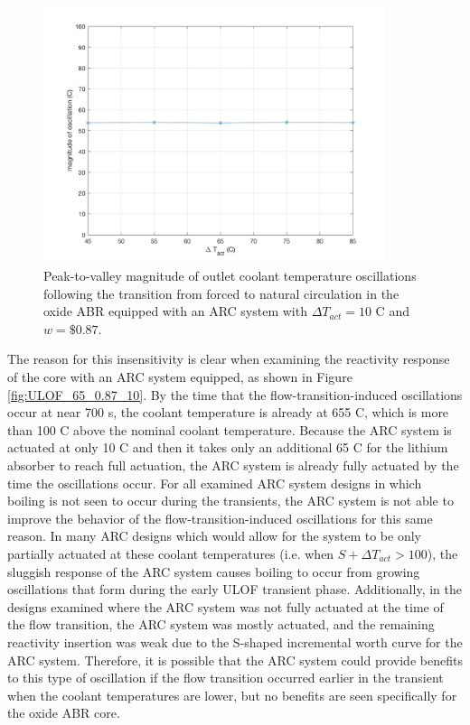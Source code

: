 \documentclass[11pt, oneside]{article}   	%
\begin{document}
\begin{figure}[h!]
\includegraphics[width=10cm]{ULOF_oscillationsWithS}
\centering
\caption{Peak-to-valley magnitude of outlet coolant temperature oscillations following the transition from forced to natural circulation in the oxide ABR equipped with an ARC system with $\Delta T_{act} = 10$ C and $w = \$0.87$.}
\label{fig:ULOF_oscillationsWithS}
\end{figure}

The reason for this insensitivity is clear when examining the reactivity response of the core with an ARC system equipped, as shown in Figure \ref{fig:ULOF_65_0.87_10}.
By the time that the flow-transition-induced oscillations occur at near 700 s, the coolant temperature is already at 655 C, which is more than 100 C above the nominal coolant temperature. 
Because the ARC system is actuated at only 10 C and then it takes only an additional 65 C for the lithium absorber to reach full actuation, the ARC system is already fully actuated by the time the oscillations occur. 
For all examined ARC system designs in which boiling is not seen to occur during the transients, the ARC system is not able to improve the behavior of the flow-transition-induced oscillations for this same reason.
In many ARC designs which would allow for the system to be only partially actuated at these coolant temperatures (i.e. when $S+\Delta T_{act} > 100$), the sluggish response of the ARC system causes boiling to occur from growing oscillations that form during the early ULOF transient phase.
Additionally, in the designs examined where the ARC system was not fully actuated at the time of the flow transition, the ARC system was mostly actuated, and the remaining reactivity insertion was weak due to the S-shaped incremental worth curve for the ARC system.
Therefore, it is possible that the ARC system could provide benefits to this type of oscillation if the flow transition occurred earlier in the transient when the coolant temperatures are lower, but no benefits are seen specifically for the oxide ABR core.
\end{document}
